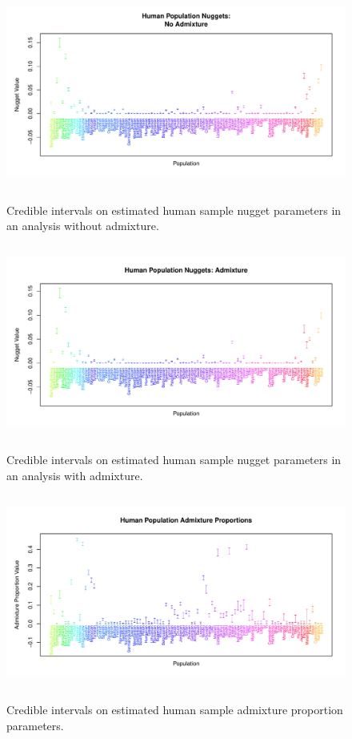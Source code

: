 \documentclass[12pt]{article}
\begin{document}
\begin{figure}
\centering
	{\includegraphics[width=5in,height=2.5in]{figs/globetrotter/globe_NoAd_nugget.pdf}}
	\caption{Credible intervals on estimated human sample nugget parameters in an analysis without admixture.}\label{sfig:globe_noad_nugg}
\end{figure}

\begin{figure}
\centering
	{\includegraphics[width=5in,height=2.5in]{figs/globetrotter/globe_Ad_nugget.pdf}}
	\caption{Credible intervals on estimated human sample nugget parameters in an analysis with admixture.}\label{sfig:globe_ad_nugg}
\end{figure}

\begin{figure}
\centering
	{\includegraphics[width=5in,height=2.5in]{figs/globetrotter/globe_adprop.pdf}}
	\caption{Credible intervals on estimated human sample admixture proportion parameters.}\label{sfig:globe_adprops}
\end{figure}
\end{document}
